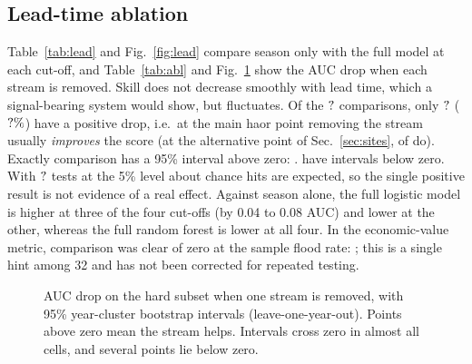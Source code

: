 \begin{table}[t]
\centering\caption{Leave-one-year-out AUC. ``Hard'' = 52 pre-monsoon and monsoon events.}\label{tab:base}
\small{}
\end{table}

\subsection{Lead-time ablation}
Table~\ref{tab:lead} and Fig.~\ref{fig:lead} compare season only with the full model at each cut-off, and Table~\ref{tab:abl} and Fig.~\ref{fig:ablation} show the AUC drop when each stream is removed. Skill does not decrease smoothly with lead time, which a signal-bearing system would show, but fluctuates. Of the $?$ comparisons, only $?$ ($?\%$) have a positive drop, i.e.\ at the main haor point removing the stream usually \emph{improves} the score (at the alternative point of Sec.~\ref{sec:sites}, \nPosSun{} of \nCells{} do). Exactly \nSigPos{} comparison has a 95\% interval above zero: \sigPosText. \nSigNeg{} have intervals below zero. With $?$ tests at the 5\% level about \expectedChance{} chance hits are expected, so the single positive result is not evidence of a real effect. Against season alone, the full logistic model is higher at three of the four cut-offs (by 0.04 to 0.08 AUC) and lower at the other, whereas the full random forest is lower at all four. In the economic-value metric, \nSigRev{} comparison was clear of zero at the sample flood rate: \sigRevText; this is a single hint among 32 and has not been corrected for repeated testing.

\begin{table}[t]
\centering\caption{AUC on the hard subset by information cut-off (days before the event).}\label{tab:lead}
\small{}
\end{table}

\begin{table}[t]
\centering\caption{AUC drop when a stream is removed (positive = stream helps). $^{*}$: 95\% year-cluster bootstrap interval excludes zero.}\label{tab:abl}
\small{}
\end{table}

\begin{figure}[t]
\centering{}
\caption{AUC drop on the hard subset when one stream is removed, with 95\% year-cluster bootstrap intervals (leave-one-year-out). Points above zero mean the stream helps. Intervals cross zero in almost all cells, and several points lie below zero.}\label{fig:ablation}
\end{figure}

